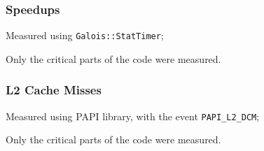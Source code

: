 \begin{frame}
	\frametitle{Speedups}
	\begin{figure}
	\end{figure}

	Measured using \texttt{Galois::StatTimer};

	Only the critical parts of the code were measured.
\end{frame}

\begin{frame}
	\frametitle{L2 Cache Misses}
	\begin{figure}
	\end{figure}

	Measured using PAPI library, with the event \texttt{PAPI_L2_DCM};

	Only the critical parts of the code were measured.
\end{frame}